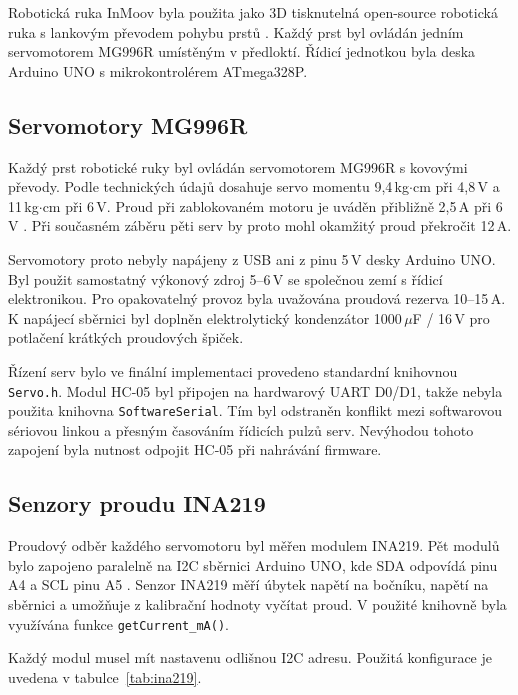 Robotická ruka InMoov byla použita jako 3D tisknutelná open-source robotická ruka s lankovým převodem pohybu prstů \cite{InMoov}. Každý prst byl ovládán jedním servomotorem MG996R umístěným v předloktí. Řídicí jednotkou byla deska Arduino UNO s mikrokontrolérem ATmega328P.

\subsection{Servomotory MG996R}
\label{subsec:mg996r}

Každý prst robotické ruky byl ovládán servomotorem MG996R s kovovými převody. Podle technických údajů dosahuje servo momentu 9,4\,kg$\cdot$cm při 4,8\,V a 11\,kg$\cdot$cm při 6\,V. Proud při zablokovaném motoru je uváděn přibližně 2,5\,A při 6\,V \cite{mg996r_towerpro}. Při současném záběru pěti serv by proto mohl okamžitý proud překročit 12\,A.

Servomotory proto nebyly napájeny z USB ani z pinu 5\,V desky Arduino UNO\@. Byl použit samostatný výkonový zdroj 5--6\,V se společnou zemí s řídicí elektronikou. Pro opakovatelný provoz byla uvažována proudová rezerva 10--15\,A. K napájecí sběrnici byl doplněn elektrolytický kondenzátor 1000\,$\mu$F / 16\,V pro potlačení krátkých proudových špiček.

Řízení serv bylo ve finální implementaci provedeno standardní knihovnou \texttt{Servo.h}. Modul HC-05 byl připojen na hardwarový UART D0/D1, takže nebyla použita knihovna \texttt{SoftwareSerial}. Tím byl odstraněn konflikt mezi softwarovou sériovou linkou a přesným časováním řídicích pulzů serv. Nevýhodou tohoto zapojení byla nutnost odpojit HC-05 při nahrávání firmware.

\subsection{Senzory proudu INA219}
\label{subsec:ina219}

Proudový odběr každého servomotoru byl měřen modulem INA219. Pět modulů bylo zapojeno paralelně na I2C sběrnici Arduino UNO, kde SDA odpovídá pinu A4 a SCL pinu A5 \cite{Lebosse2011,ti_ina219}. Senzor INA219 měří úbytek napětí na bočníku, napětí na sběrnici a umožňuje z kalibrační hodnoty vyčítat proud. V použité knihovně byla využívána funkce \texttt{getCurrent\_mA()}.

Každý modul musel mít nastavenu odlišnou I2C adresu. Použitá konfigurace je uvedena v tabulce~\ref{tab:ina219}.


